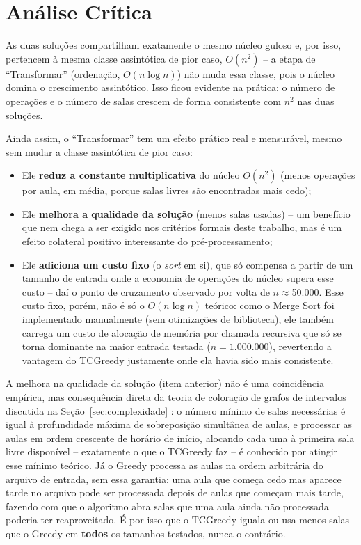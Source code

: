 \documentclass[12pt]{article}
\begin{document}
\section{Análise Crítica}

As duas soluções compartilham exatamente o mesmo núcleo guloso e, por
isso, pertencem à mesma classe assintótica de pior caso, $O(n^2)$ -- a
etapa de ``Transformar'' (ordenação, $O(n \log n)$) não muda essa classe,
pois o núcleo domina o crescimento assintótico. Isso ficou evidente na
prática: o número de operações e o número de salas crescem de forma
consistente com $n^2$ nas duas soluções.

Ainda assim, o ``Transformar'' tem um efeito prático real e mensurável,
mesmo sem mudar a classe assintótica de pior caso:

\begin{itemize}
\item Ele \textbf{reduz a constante multiplicativa} do núcleo $O(n^2)$
  (menos operações por aula, em média, porque salas livres são
  encontradas mais cedo);
\item Ele \textbf{melhora a qualidade da solução} (menos salas usadas) --
  um benefício que nem chega a ser exigido nos critérios formais deste
  trabalho, mas é um efeito colateral positivo interessante do
  pré-processamento;
\item Ele \textbf{adiciona um custo fixo} (o \textit{sort} em si), que só
  compensa a partir de um tamanho de entrada onde a economia de operações
  do núcleo supera esse custo -- daí o ponto de cruzamento observado por
  volta de $n\approx$50.000. Esse custo fixo, porém, não é só o
  $O(n\log n)$ teórico: como o Merge Sort foi implementado manualmente
  (sem otimizações de biblioteca), ele também carrega um custo de
  alocação de memória por chamada recursiva que só se torna dominante na
  maior entrada testada ($n=1.000.000$), revertendo a vantagem do
  TCGreedy justamente onde ela havia sido mais consistente.
\end{itemize}

A melhora na qualidade da solução (item anterior) não é uma coincidência
empírica, mas consequência direta da teoria de coloração de grafos de
intervalos discutida na Seção~\ref{sec:complexidade} \cite{cormen:09}: o
número mínimo de salas necessárias é igual à profundidade máxima de
sobreposição simultânea de aulas, e processar as aulas em ordem crescente
de horário de início, alocando cada uma à primeira sala livre disponível
-- exatamente o que o TCGreedy faz -- é conhecido por atingir esse mínimo
teórico. Já o Greedy processa as aulas na ordem arbitrária do arquivo de
entrada, sem essa garantia: uma aula que começa cedo mas aparece tarde no
arquivo pode ser processada depois de aulas que começam mais tarde,
fazendo com que o algoritmo abra salas que uma aula ainda não processada
poderia ter reaproveitado. É por isso que o TCGreedy iguala ou usa menos
salas que o Greedy em \textbf{todos} os tamanhos testados, nunca o
contrário.
\end{document}
